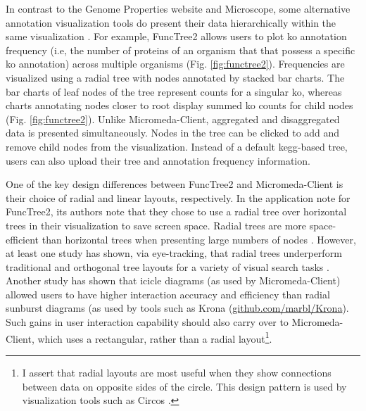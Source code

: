 In contrast to the Genome Properties website and Microscope, some alternative 
annotation visualization tools do present their data hierarchically within the 
same visualization \cite{darzi2019functree2}. For example, FuncTree2 
\cite{darzi2019functree2} allows users to plot \gls{ko}  annotation 
\cite{mao2005automated,kanehisa2011kegg} frequency (i.e, the number of proteins 
of an organism that that possess a specific \gls{ko}  annotation) across 
multiple organisms (Fig. \ref{fig:functree2}). Frequencies are visualized using 
a radial tree with nodes annotated by stacked bar charts. The bar charts of leaf 
nodes of the tree represent counts for a singular \gls{ko}, whereas charts 
annotating nodes closer to root display summed \gls{ko}  counts for child nodes 
(Fig. \ref{fig:functree2}). Unlike Micromeda-Client, aggregated and 
disaggregated data is presented simultaneously. Nodes in the tree can be clicked 
to add and remove child nodes from the visualization. Instead of a default 
\gls{kegg}-based tree, users can also upload their tree and annotation frequency 
information.

One of the key design differences between FuncTree2 and Micromeda-Client is 
their choice of radial and linear layouts, respectively. In the application note 
for FuncTree2, its authors note that they chose to use a radial tree over 
horizontal trees in their visualization to save screen space. Radial trees are 
more space-efficient than horizontal trees when presenting large numbers of 
nodes \cite{burch2011evaluation}. However, at least one study has shown, via 
eye-tracking, that radial trees underperform traditional and orthogonal tree 
layouts for a variety of visual search tasks \cite{burch2011evaluation}. Another 
study has shown that icicle diagrams (as used by Micromeda-Client) allowed users 
to have higher interaction accuracy and efficiency \cite{muramalla2017radial} 
than radial sunburst diagrams (as used by tools such as Krona 
\cite{ondov2011interactive} 
(\href{http://github.com/marbl/Krona}{github.com/marbl/Krona}).
Such gains in user interaction capability should also carry over to 
Micromeda-Client, which uses a rectangular, rather than a radial 
layout\footnote{I assert that radial layouts are most useful when they show 
connections between data on opposite sides of the circle. This design pattern is 
used by visualization tools such as Circos \cite{krzywinski2009circos}.}.

